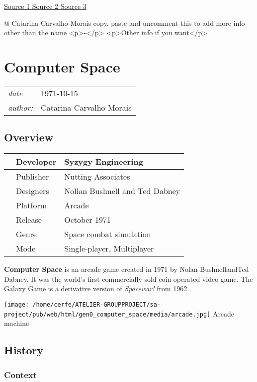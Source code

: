\documentclass[a4paper,10pt]{book}
\newcommand{\pageHeader}[4]{
    \section{#1}
    \vspace{-0.3cm}
    \begin{table}[h!]
     \begin{tabular}{ll}
        \hline
        \textit{date} & #2 \\
        \textit{author: } & #3\\
        \hline
     \end{tabular}
    \end{table}
    \vspace{-0.3cm}
}
\begin{document}
 \href{https://en.wikipedia.org/wiki/Galaxy_Game}{Source 1 }
 \href{https://archive.org/details/arcade_galgame}{Source 2 }
 \href{http://infolab.stanford.edu/pub/voy/museum/galaxy.html}{Source 3 }
 
 
 
 @ Catarina Carvalho Morais 
  copy, paste and uncomment this to add more info other than the name
            <p>-</p>
            <p>Other info if you want</p>
           
 
 \newpage\pageHeader{Computer Space}{1971-10-15}{Catarina Carvalho Morais}{Computer Space, an arcade game created in 1971}
 \subsection{Overview }
 \begin{longtable}{p{1mm}|l|l|}\hline
 
 & Developer 
 & Syzygy Engineering 
 \\\hline
 
 & Publisher 
 & Nutting Associates 
 \\\hline
 
 & Designers 
 & Nollan Bushnell and Ted Dabney 
 \\\hline
 
 & Platform 
 & Arcade 
 \\\hline
 
 & Release 
 & October 1971 
 \\\hline
 
 & Genre 
 & Space combat simulation 
 \\\hline
 
 & Mode 
 & Single-player, Multiplayer 
 \\\hline
 \end{longtable}
 
 
 \textbf{Computer Space }  is an arcade game created in 1971 by Nolan BushnellandTed Dabney.
          It was the world's first commercially sold coin-operated video game. 
          The Galaxy Game is a derivative version of  \textit{Spacewar! } from 1962. 
 
 
 
 \texttt{[image: /home/cerfe/ATELIER-GROUPPROJECT/sa-project/pub/web/html/gen0\_computer\_space/media/arcade.jpg]}
 Arcade machine 
 
 \subsection{History }
 \subsubsection{Context }
 
\end{document}
